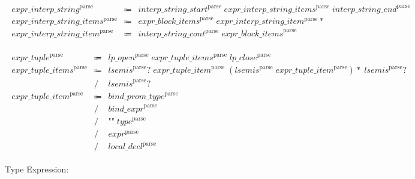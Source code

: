 \begin{align*}
    \begin{array}{rcll}
        \mathit{expr\_interp\_string}^\mathrm{parse}
        &\Coloneq &\mathit{interp\_string\_start}^\mathrm{parse}\; \mathit{expr\_interp\_string\_items}^\mathrm{parse}\; \mathit{interp\_string\_end}^\mathrm{parse} \\
        \mathit{expr\_interp\_string\_items}^\mathrm{parse}
        &\Coloneq &\mathit{expr\_block\_items}^\mathrm{parse}\; \mathit{expr\_interp\_string\_item}^\mathrm{parse}{*} \\
        \mathit{expr\_interp\_string\_item}^\mathrm{parse}
        &\Coloneq &\mathit{interp\_string\_cont}^\mathrm{parse}\; \mathit{expr\_block\_items}^\mathrm{parse}
    \end{array}
\end{align*}

\begin{align*}
    \begin{array}{rcll}
        \mathit{expr\_tuple}^\mathrm{parse}
        &\Coloneq &\mathit{lp\_open}^\mathrm{parse}\; \mathit{expr\_tuple\_items}^\mathrm{parse}\; \mathit{lp\_close}^\mathrm{parse} \\
        \mathit{expr\_tuple\_items}^\mathrm{parse}
        &\Coloneq &\mathit{lsemis}^\mathrm{parse}{?}\; \mathit{expr\_tuple\_item}^\mathrm{parse}\; (\mathit{lsemis}^\mathrm{parse}\; \mathit{expr\_tuple\_item}^\mathrm{parse}){*}\; \mathit{lsemis}^\mathrm{parse}{?} \\
        &\mathrel{/} &\mathit{lsemis}^\mathrm{parse}{?} \\
        \mathit{expr\_tuple\_item}^\mathrm{parse}
        &\Coloneq &\mathit{bind\_prom\_type}^\mathrm{parse} \\
        &\mathrel{/} &\mathit{bind\_expr}^\mathrm{parse} \\
        &\mathrel{/} &\texttt{"\^{}"}\; \mathit{type}^\mathrm{parse} \\
        &\mathrel{/} &\mathit{expr}^\mathrm{parse} \\
        &\mathrel{/} &\mathit{local\_decl}^\mathrm{parse}
    \end{array}
\end{align*}

Type Expression:

